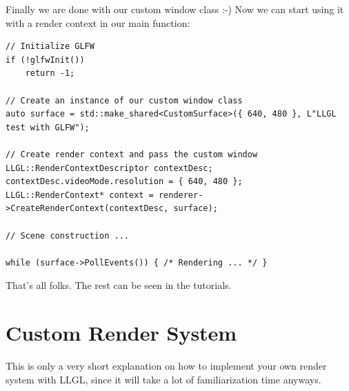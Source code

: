 \documentclass{article}
\begin{document}
Finally we are done with our custom window class :-) Now we can start using it with a render context in our main function:
\begin{lstlisting}
// Initialize GLFW
if (!glfwInit())
	return -1;

// Create an instance of our custom window class
auto surface = std::make_shared<CustomSurface>({ 640, 480 }, L"LLGL test with GLFW");

// Create render context and pass the custom window
LLGL::RenderContextDescriptor contextDesc;
contextDesc.videoMode.resolution = { 640, 480 };
LLGL::RenderContext* context = renderer->CreateRenderContext(contextDesc, surface);

// Scene construction ...

while (surface->PollEvents()) { /* Rendering ... */ }
\end{lstlisting}
That's all folks. The rest can be seen in the tutorials.



\newpage
\section{Custom Render System}
\label{sec:custom_renderer}

This is only a very short explanation on how to implement your own render system with LLGL,
since it will take a lot of familiarization time anyways.
\end{document}

